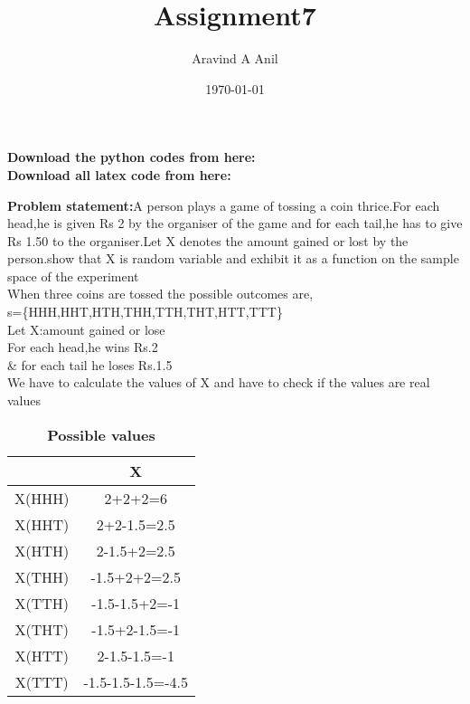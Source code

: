 \documentclass[11pt,a4paper,twocolumn]{article}
\title{Assignment7}
\author{Aravind A Anil}
\date{\today}
\begin{document}
\maketitle
\begin{flushleft}
\textbf{Download the python codes from here:}
\\[5pt]
\textbf{Download all latex code from here:}
\\

\textbf{Problem statement:}A person plays a game of tossing a coin thrice.For each head,he is given Rs 2 by the organiser of the game and for each tail,he has to give Rs 1.50 to the organiser.Let X denotes the amount gained or lost by the person.show that X is random variable and exhibit it as a function on the sample space of the experiment\\
When three coins are tossed the possible outcomes are,\\
s=\{HHH,HHT,HTH,THH,TTH,THT,HTT,TTT\}\\
Let X:amount gained or lose\\
For each head,he wins Rs.2\\
\& for each tail he loses Rs.1.5\\
We have to calculate the values of X and have to check if the values are real values\\
\begin{table}[h!]
    \centering
    \begin{tabular}{|c|c|}
    \hline
         &X  \\[5pt]
         \hline
         X(HHH)&2+2+2=6\\[4pt]
         \hline
         X(HHT)&2+2-1.5=2.5\\[4pt]
         \hline
         X(HTH)&2-1.5+2=2.5\\[4pt]
         \hline
         X(THH)&-1.5+2+2=2.5\\[4pt]
         \hline
         X(TTH)&-1.5-1.5+2=-1\\[4pt]
         \hline
         X(THT)&-1.5+2-1.5=-1\\[4pt]
         \hline
         X(HTT)&2-1.5-1.5=-1\\[4pt]
         \hline
         X(TTT)&-1.5-1.5-1.5=-4.5\\
         \hline
    \end{tabular}
    \caption{\textbf{Possible values}}
\end{table}
\end{flushleft}
\end{document}
